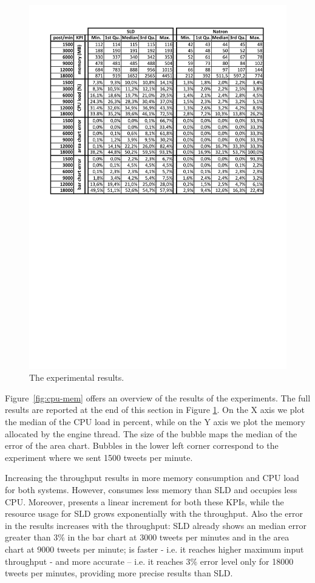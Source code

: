 \begin{figure}[t]
\centering
\includegraphics[width=\textwidth]{img/comp-mod-results}
\caption{The experimental results.}
\label{fig:all-data}
\end{figure}

Figure~\ref{fig:cpu-mem} offers an overview of the results of the experiments. The full results are reported at the end of this section in Figure \ref{fig:all-data}. On the X axis we plot the median of the CPU load in percent, while on the Y axis we plot the memory allocated by the engine thread. The size of the bubble maps the median of the error of the area chart. Bubbles in the lower left corner correspond to the experiment where we sent 1500 tweets per minute.

Increasing the throughput results in more memory consumption and CPU load for both systems. However, \sti{} consumes less memory than SLD and occupies less CPU. Moreover, \sti{} presents a linear increment for both these KPIs, while the resource usage for SLD grows exponentially with the throughput. Also the error in the results increases with the throughput: SLD already shows an median error greater than 3\% in the bar chart at 3000 tweets per minutes and in the area chart at 9000 tweets per minute; \sti{} is faster - i.e. it reaches higher maximum input throughput - and more accurate -- i.e. it reaches 3\% error level only for 18000 tweets per minutes, providing more precise results than SLD.

